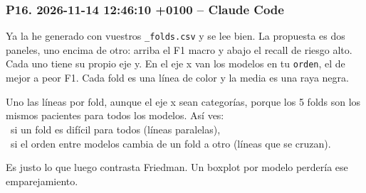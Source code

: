 \documentclass[11pt,a4paper]{article}
\begin{document}
\subsubsection*{P16. 2026-11-14 12:46:10 +0100 -- Claude Code}
{\small
Ya la he generado con vuestros \texttt{\_\allowbreak{}folds.csv} y se lee bien. La propuesta es dos paneles, uno encima de otro: arriba el F1 macro y abajo el recall de riesgo alto. Cada uno tiene su propio eje y. En el eje x van los modelos en tu \texttt{orden}, el de mejor a peor F1. Cada fold es una línea de color y la media es una raya negra.

Uno las líneas por fold, aunque el eje x sean categorías, porque los 5 folds son los mismos pacientes para todos los modelos. Así ves: \\{}
\hspace*{1.0em}\textbullet~si un fold es difícil para todos (líneas paralelas), \\{}
\hspace*{1.0em}\textbullet~si el orden entre modelos cambia de un fold a otro (líneas que se cruzan).

Es justo lo que luego contrasta Friedman. Un boxplot por modelo perdería ese emparejamiento.

}
\end{document}
